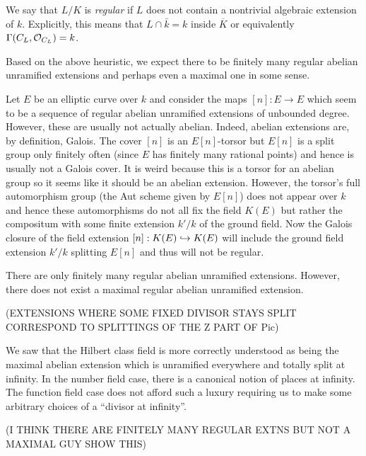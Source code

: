 \documentclass[12pt]{article}
\begin{document}
\begin{defn}
We say that $L / K$ is \textit{regular} if $L$ does not contain a nontrivial algebraic extension of $k$. Explicitly, this means that $L \cap \bar{k} = k$ inside $\overline{K}$ or equivalently $\Gamma(C_L, \mathcal{O}_{C_L}) = k$.
\end{defn}

\begin{rmk}
Based on the above heuristic, we expect there to be finitely many regular abelian unramified extensions and perhaps even a maximal one in some sense. 
\end{rmk}

\begin{example}
Let $E$ be an elliptic curve over $k$ and consider the maps $[n] : E \to E$ which seem to be a sequence of regular abelian unramified extensions of unbounded degree. However, these are usually not actually abelian. Indeed, abelian extensions are, by definition, Galois. The cover $[n]$ is an $E[n]$-torsor but $E[n]$ is a split group only finitely often (since $E$ has finitely many rational points) and hence is usually not a Galois cover. It is weird because this is a torsor for an abelian group so it seems like it should be an abelian extension. However, the torsor's full automorphism group (the Aut scheme given by $E[n]$) does not appear over $k$ and hence these automorphisms do not all fix the field $K(E)$ but rather the compositum with some finite extension $k' / k$ of the ground field. Now the Galois closure of the field extension $[n] : K(E) \hookrightarrow K(E)$ will include the ground field extension $k' / k$ splitting $E[n]$ and thus will not be regular.
\end{example}

\begin{prop}
There are only finitely many regular abelian unramified extensions. However, there does not exist a maximal regular abelian unramified extension. 
\end{prop}

(EXTENSIONS WHERE SOME FIXED DIVISOR STAYS SPLIT CORRESPOND TO SPLITTINGS OF THE Z PART OF Pic)

We saw that the Hilbert class field is more correctly understood as being the maximal abelian extension which is unramified everywhere and totally split at infinity. In the number field case, there is a canonical notion of places at infinity. The function field case does not afford such a luxury requiring us to make some arbitrary choices of a ``divisor at infinity''. 

(I THINK THERE ARE FINITELY MANY REGULAR EXTNS BUT NOT A MAXIMAL GUY SHOW THIS)
\end{document}
